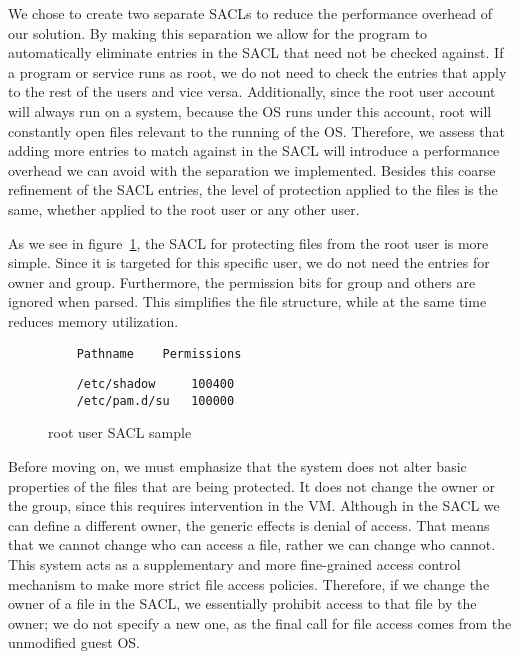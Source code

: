 \par We chose to create two separate \acp{SACL} to reduce the performance overhead of our solution. By making this separation we allow for the program to automatically eliminate entries in the \ac{SACL} that need not be checked against. If a program or service runs as root, we do not need to check the entries that apply to the rest of the users and vice versa. Additionally, since the root user account will always run on a system, because the \ac{OS} runs under this account, root will constantly open files relevant to the running of the \ac{OS}. Therefore, we assess that adding more entries to match against in the \ac{SACL} will introduce a performance overhead we can avoid with the separation we implemented. Besides this coarse refinement of the \ac{SACL} entries, the level of protection applied to the files is the same, whether applied to the root user or any other user.

\par As we see in figure~\ref{fig:root_sacl}, the \ac{SACL} for protecting files from the root user is more simple. Since it is targeted for this specific user, we do not need the entries for owner and group. Furthermore, the permission bits for group and others are ignored when parsed. This simplifies the file structure, while at the same time reduces memory utilization.

\begin{figure}[ht]
	\centering
	\begin{lstlisting}
	Pathname	Permissions	
	\end{lstlisting}
	\footnotesize{\selectfont 
	\begin{lstlisting}
	/etc/shadow     100400
	/etc/pam.d/su   100000
	\end{lstlisting}}
	\caption{root user \ac{SACL} sample}
	\label{fig:root_sacl}
\end{figure}


\par Before moving on, we must emphasize that the system does not alter basic properties of the files that are being protected. It does not change the owner or the group, since this requires intervention in the \ac{VM}. Although in the \ac{SACL} we can define a different owner, the generic effects is denial of access. That means that we cannot change who can access a file, rather we can change who cannot. This system acts as a supplementary and more fine-grained access control mechanism to make more strict file access policies. Therefore, if we change the owner of a file in the \ac{SACL}, we essentially prohibit access to that file by the owner; we do not specify a new one, as the final call for file access comes from the unmodified guest \ac{OS}.




